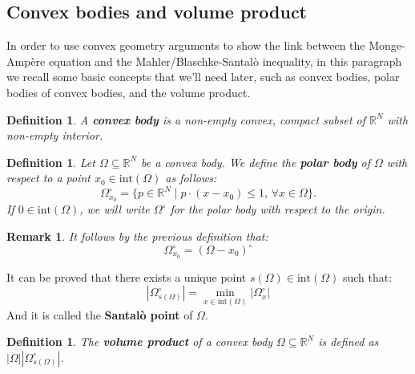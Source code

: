 \documentclass[10pt,a4paper]{amsart}
\newtheorem{definition}[theorem]{Definition}
\newtheorem{remark}[theorem]{Remark}
\numberwithin{equation}{section}
\begin{document}
\subsection{Convex bodies and volume product}
In order to use convex geometry arguments to show the link between the Monge-Ampère equation and the Mahler/Blaschke-Santalò inequality, in this paragraph we recall some basic concepts that we'll need later, such as convex bodies, polar bodies of convex bodies, and the volume product.
\begin{definition}\label{def:cbody}
    A \textbf{convex body} is a non-empty convex, compact subset of $\mathbb{R}^N$ with non-empty interior.
\end{definition}

\begin{definition}
    Let $\Omega \subseteq \mathbb{R}^N$ be a convex body. We define the \textbf{polar body} of $\Omega$ with respect to a point $x_0 \in \text{int}(\Omega)$ as follows:
    \begin{equation}\label{eq:polar}
    \Omega^\circ_{x_0} = \{p \in \mathbb{R}^N \mid p \cdot (x-x_0) \leq 1, \, \forall x \in \Omega\}.
    \end{equation}
    If $0 \in \text{int}(\Omega)$, we will write $\Omega^\circ$ for the polar body with respect to the origin.
\end{definition}

\begin{remark}
    It follows by the previous definition that:
    \[
    \Omega^\circ_{x_0} = (\Omega-x_0)^\circ
    \]
\end{remark}

\noindent It can be proved that there exists a unique point $s(\Omega) \in \text{int}(\Omega)$ such that:
\[
|\Omega^\circ_{s(\Omega)}| = \min_{x \in \text{int}(\Omega)} |\Omega^\circ_x|
\]
And it is called the \textbf{Santalò point} of $\Omega$.

\begin{definition}
    The \textbf{volume product} of a convex body $\Omega \subseteq \mathbb{R}^N$ is defined as $|\Omega||\Omega^\circ_{s(\Omega)}|$.
\end{definition}
\end{document}
